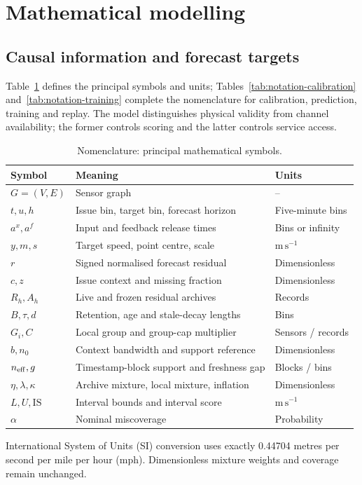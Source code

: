 \documentclass[pdflatex,sn-mathphys-num]{sn-jnl}
\newcommand{\ms}{\mathrm{m\,s^{-1}}}
\begin{document}
\section{Mathematical modelling}\label{sec:math}
\subsection{Causal information and forecast targets}
Table~\ref{tab:notation} defines the principal symbols and units; Tables~\ref{tab:notation-calibration} and~\ref{tab:notation-training} complete the nomenclature for calibration, prediction, training and replay. The model distinguishes physical validity from channel availability; the former controls scoring and the latter controls service access.

\begin{table}[!htbp]
\caption{Nomenclature: principal mathematical symbols.}\label{tab:notation}
\centering\setlength{\tabcolsep}{3pt}\small
\begin{tabular}{lll}\toprule
Symbol & Meaning & Units \\\midrule
$G=(V,E)$ & Sensor graph & -- \\
$t,u,h$ & Issue bin, target bin, forecast horizon & Five-minute bins \\
$a^x,a^f$ & Input and feedback release times & Bins or infinity \\
$y,m,s$ & Target speed, point centre, scale & $\ms$ \\
$r$ & Signed normalised forecast residual & Dimensionless \\
$c,z$ & Issue context and missing fraction & Dimensionless \\
$R_h,A_h$ & Live and frozen residual archives & Records \\
$B,\tau,d$ & Retention, age and stale-decay lengths & Bins \\
$G_i,C$ & Local group and group-cap multiplier & Sensors / records \\
$b,n_0$ & Context bandwidth and support reference & Dimensionless \\
$n_{\rm eff},g$ & Timestamp-block support and freshness gap & Blocks / bins \\
$\eta,\lambda,\kappa$ & Archive mixture, local mixture, inflation & Dimensionless \\
$L,U,\mathrm{IS}$ & Interval bounds and interval score & $\ms$ \\
$\alpha$ & Nominal miscoverage & Probability \\
\bottomrule\end{tabular}
\par\smallskip\footnotesize International System of Units (SI) conversion uses exactly 0.44704 metres per second per mile per hour (mph). Dimensionless mixture weights and coverage remain unchanged.
\end{table}
\FloatBarrier
\end{document}
